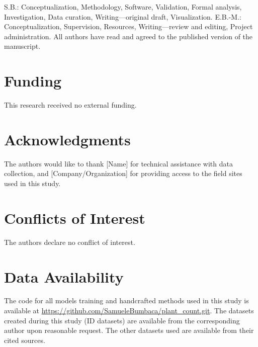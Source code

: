 \documentclass{article}
\begin{document}
S.B.: Conceptualization, Methodology, Software, Validation, Formal analysis, Investigation, Data curation, Writing—original draft, Visualization. E.B.-M.: Conceptualization, Supervision, Resources, Writing—review and editing, Project administration. All authors have read and agreed to the published version of the manuscript.

\section{Funding}

This research received no external funding.

\section{Acknowledgments}

The authors would like to thank [Name] for technical assistance with data collection, and [Company/Organization] for providing access to the field sites used in this study.

\section{Conflicts of Interest}

The authors declare no conflict of interest.

\section{Data Availability}

The code for all models training and handcrafted methods used in this study is available at \url{https://github.com/SamueleBumbaca/plant_count.git}. The datasets created during this study (ID datasets) are available from the corresponding author upon reasonable request. The other datasets used are available from their cited sources.




\end{document}
